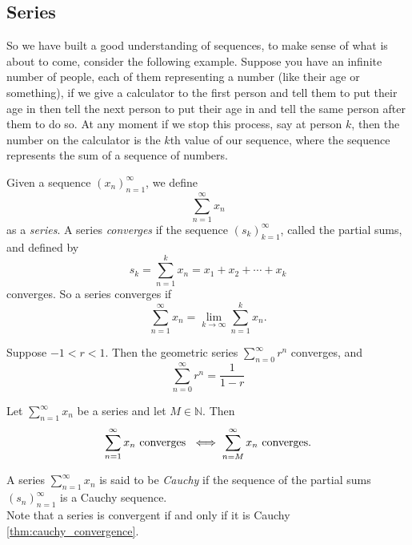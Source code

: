 \documentclass[../main.tex]{subfiles}
\begin{document}
    
    \subsection{Series}
    \par So we have built a good understanding of sequences, to make sense of what is about to come, consider the following example. Suppose you have an infinite number of people, each of them representing a number (like their age or something), if we give a calculator to the first person and tell them to put their age in then tell the next person to put their age in and tell the same person after them to do so. At any moment if we stop this process, say at person $k$, then the number on the calculator is the $k$th value of our sequence, where the sequence represents the sum of a sequence of numbers. 
    
    \begin{definition}[Series]\label{def:series}
    Given a sequence $ (x_n)^\infty_{n=1}$, we define
    \[
    \sum_{n=1}^\infty{x_n}
    \]
    as a \textit{series}. A series \textit{converges} if the sequence $ (s_k)^\infty_{k=1}$, called the partial sums, and defined by
    \[
    s_k = \sum_{n = 1}^k{x_n} = x_1 + x_2 + \cdots + x_k
    \]
    converges. So a series converges if
    \[
    \sum_{n=1}^\infty{x_n} = \lim_{k \to \infty}{\sum_{n = 1}^k{x_n}}.
    \]
    \end{definition}
    
    
    
    
    
    \begin{proposition}\label{prp:geo_series}
    Suppose $ -1 < r < 1.$ Then the geometric series $ \sum_{n=0}^\infty{r^n}$ converges, and 
    \[
    \sum_{n=0}^\infty{r^n} = \frac{1}{1-r}
    \]
    \end{proposition}
    
    
    
    
    
    
    \begin{exercise}
    Let $\sum_{n=1}^\infty{x_n}$ be a series and let $M \in \mathbb{N}$. Then
    \[
    \sum_{n=1}^\infty{x_n} \textnormal{ converges } \iff \sum_{n=M}^\infty{x_n} \textnormal{ converges.}
    \]
    \end{exercise}
    
    
    \begin{definition}
    A series $\sum_{n=1}^\infty{x_n}$ is said to be \textit{Cauchy} if the sequence of the partial sums $ (s_n)^\infty_{n=1}$ is a Cauchy sequence.\\
    Note that a series is convergent if and only if it is Cauchy \ref{thm:cauchy_convergence}.
    \end{definition}
    
\end{document}
